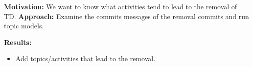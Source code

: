  \vspace{3mm}
 \noindent\rqiv
 \vspace{3mm}

 \noindent \textbf{Motivation:} 
We want to know what activities tend to lead to the removal of TD.
 \vspace{1mm}
 \noindent \textbf{Approach:} 
Examine the commits messages of the removal commits and run topic models.
 \vspace{1mm}
 
 \noindent \textbf{Results:} 
\begin{itemize}
\item Add topics/activities that lead to the removal.
\end{itemize}
 \conclusionbox{}